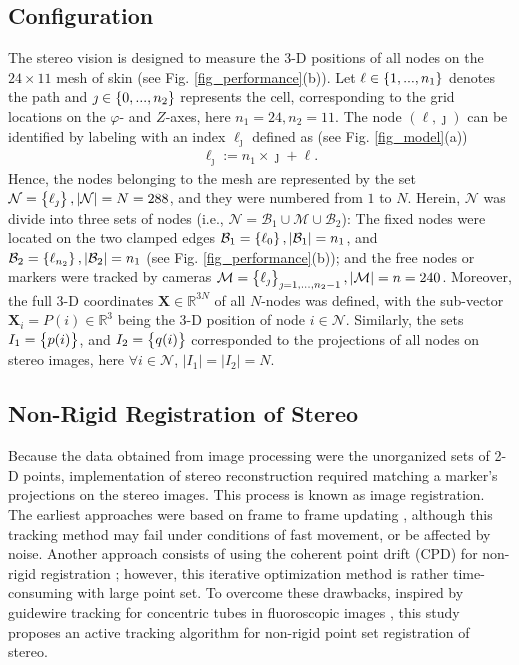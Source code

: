 \documentclass[10pt,letterpaper,journal,final,twoside,twocolumn,nofonttune]{IEEEtran}
\begin{document}
\subsection{Configuration}
The stereo vision is designed to measure the 3-D positions of all nodes on the $24\times11$ mesh of skin (see Fig. \ref{fig_performance}(b)). Let $\ell\in \set{1,...,n_1}$ denotes the path and $\jmath\in \set{0,...,n_2}$ represents the cell, corresponding to the grid locations on the $\varphi$- and $Z$-axes, here $n_1 = 24,n_2 = 11$. The node $(\ell,\jmath)$ can be identified by labeling with an index $\ell_\jmath$ defined as (see Fig. \ref{fig_model}(a))
\begin{align}
\label{eq_stereo_16}
\ell_\jmath := n_1\times\jmath +\ell.
\end{align}
Hence, the nodes belonging to the mesh are represented by the set $\mathcal{N}=\set{\ell_\jmath}, |\mathcal{N}|=N=288$, and they were numbered from $1$ to $N$.  Herein, $\mathcal{N}$ was divide into three sets of nodes (i.e., $\mathcal{N} = \mathcal{B}_1 \cup \mathcal{M} \cup \mathcal{B}_2$): The fixed nodes were located on the two clamped edges $\mathcal{B}_1=\set{\ell_0}, |\mathcal{B}_1|=n_1$, and $\mathcal{B}_2=\set{\ell_{n_2}},|\mathcal{B}_2|=n_1$ (see Fig. \ref{fig_performance}(b)); and the free nodes or markers were tracked by cameras $\mathcal{M} = \set{\ell_\jmath}_{\jmath=1,...,n_2-1},|\mathcal{M}|=n=240$. Moreover, the full 3-D coordinates $\mathbf{X}\in \mathbb{R}^{3N}$ of all $N$-nodes was defined, with the sub-vector $\mathbf{X}_i=P(i)\in \mathbb{R}^{3}$ being the 3-D position of node $i \in \mathcal{N}$. Similarly, the sets $I_1 = \set{p(i)}$, and $I_2 = \set{q(i)}$ corresponded to the projections of all nodes on stereo images, here $ \forall i \in \mathcal{N}$, $|I_1|=|I_2|=N$.
\subsection{Non-Rigid Registration of Stereo}
Because the data obtained from image processing were the unorganized sets of 2-D points, implementation of stereo reconstruction required matching a marker's projections on the stereo images. This process is known as image registration. The earliest approaches were based on frame to frame updating \cite{Sakuma}, although this tracking method may fail under conditions of fast movement, or be affected by noise. Another approach consists of using the coherent point drift (CPD) for non-rigid registration \cite{Myronenko}; however, this iterative optimization method is rather time-consuming with large point set. To overcome these drawbacks, inspired by guidewire tracking for concentric tubes in fluoroscopic images \cite{Vandini}, this study proposes an active tracking algorithm for non-rigid point set registration of stereo.
\end{document}
